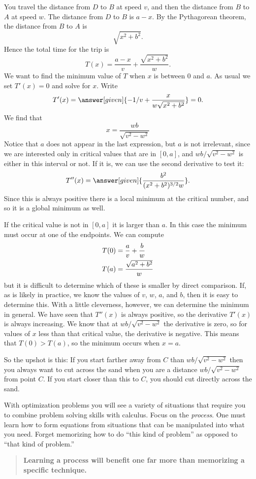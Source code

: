 \documentclass{ximera}
\begin{document}
\begin{example}
\begin{explanation}
    You travel the distance from $D$ to $B$ at speed $v$, and then the
    distance from $B$ to $A$ at speed $w$.  The distance from $D$ to $B$
    is $a-x$. By the Pythagorean theorem, the distance from $B$ to $A$
    is
    \[
    \sqrt{x^2+b^2}.
    \] 
Hence the total time for the trip is
\[
T(x)=\frac{a-x}{v}+\frac{\sqrt{x^2+b^2}}{w}.
\]
We want to find the minimum value of $T$ when $x$ is between 0 and
$a$.  As usual we set $T'(x)=0$ and solve for $x$. Write
\[
  T'(x)=\answer[given]{-1/v+\frac{x}{w\sqrt{x^2+b^2}}} =0.
\]
We find that 
\[
x=\frac{wb}{\sqrt{v^2-w^2}}
\]
Notice that $a$ does not appear in the last expression, but $a$ is not
irrelevant, since we are interested only in critical values that are
in $[0,a]$, and $wb/\sqrt{v^2-w^2}$ is either in this interval or not.
If it is, we can use the second derivative to test it:
\[
T''(x) = \answer[given]{\frac{b^2}{(x^2+b^2)^{3/2}w}}.
\]
Since this is always positive there is a local minimum at the critical
number, and so it is a global minimum as well.

If the critical value is not in $[0,a]$ it is larger than $a$. In this
case the minimum must occur at one of the endpoints. We can compute
\begin{align*}
T(0)&={a\over v}+{b\over w} \\
T(a)&={\sqrt{a^2+b^2}\over w} 
\end{align*}
but it is difficult to determine which of these is smaller by direct
comparison. If, as is likely in practice, we know the values of $v$,
$w$, $a$, and $b$, then it is easy to determine this. With a little
cleverness, however, we can determine the minimum in general. We have seen that
$T''(x)$ is always positive, so the derivative $T'(x)$ is always increasing.
We know that at $wb/\sqrt{v^2-w^2}$ the derivative is zero, so for
values of $x$ less than that critical value, the derivative is
negative. This means that $T(0)>T(a)$, so the minimum occurs when $x=a$.

So the upshot is this: If you start farther away from $C$ than
$wb/\sqrt{v^2-w^2}$ then you always want to cut across the sand 
when you are a distance $wb/\sqrt{v^2-w^2}$ from point $C$. If you
start closer than this to $C$, you should cut directly across the sand.
\end{explanation}
\end{example}


With optimization problems you will see a variety of situations that
require you to combine problem solving skills with calculus. Focus on
the \textit{process}.  One must learn how to form equations from
situations that can be manipulated into what you need. Forget
memorizing how to do ``this kind of problem'' as opposed to ``that
kind of problem.''
\begin{quote}
  \textbf{Learning a process will benefit one far more than memorizing
    a specific technique.}
\end{quote}
\end{document}
